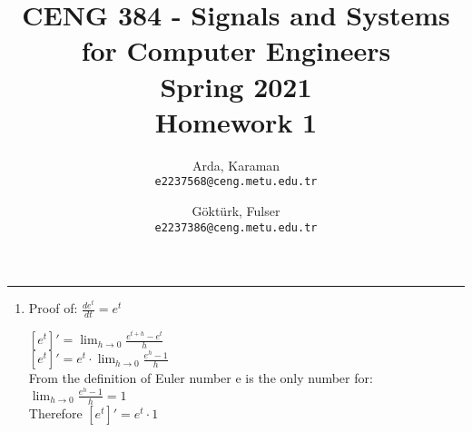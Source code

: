 \documentclass[10pt,a4paper, margin=1in]{article}
\author{
  Arda, Karaman\\
  \texttt{e2237568@ceng.metu.edu.tr}
  \and
  Göktürk, Fulser\\
  \texttt{e2237386@ceng.metu.edu.tr}
}
\title{CENG 384 - Signals and Systems for Computer Engineers \\
Spring 2021 \\
Homework 1}
\begin{document}
\maketitle



\noindent\rule{19cm}{1.2pt}

\begin{enumerate}

\item %
Proof of: \( \frac{ de^t }{ dt } = e^t \)

\( [e^t]' = \lim_{h \to 0} \frac{e^{t+h} - e^t}{h} \) \\
\( [e^t]' = e^t \cdot \lim_{h \to 0} \frac{e^{h} - 1}{h} \) \\ 
From the definition of Euler number e is the only number for: \( \lim_{h \to 0} \frac{e^{h} - 1}{h} = 1 \) \\
Therefore \( [e^t]' = e^t \cdot 1\) \\



\end{enumerate}
\end{document}
